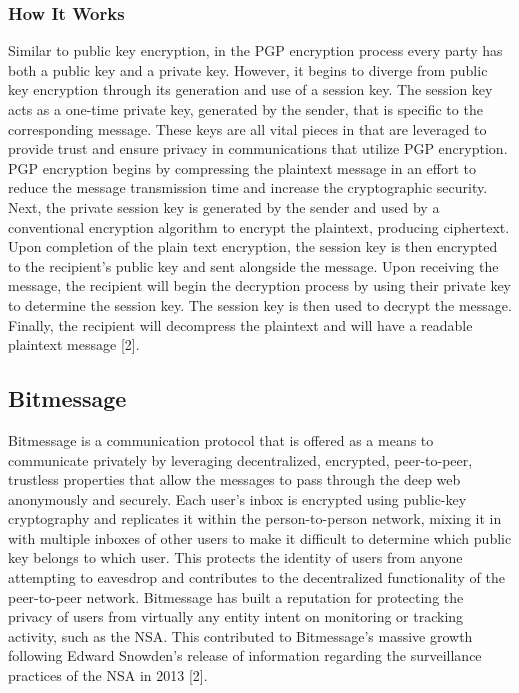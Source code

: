 \documentclass[twocolumn,letterpaper,10pt]{article}
\begin{document}
\subsubsection{How It Works}
Similar to public key encryption, in the PGP encryption process every party has both a public key and a private key. However, it begins to diverge from public key encryption through its generation and use of a session key. The session key acts as a one-time private key, generated by the sender, that is specific to the corresponding message. These keys are all vital pieces in that are leveraged to provide trust and ensure privacy in communications that utilize PGP encryption.
PGP encryption begins by compressing the plaintext message in an effort to reduce the message transmission time and increase the cryptographic security.  Next, the private session key is generated by the sender and used by a conventional encryption algorithm to encrypt the plaintext, producing ciphertext. Upon completion of the plain text encryption, the session key is then encrypted to the recipient’s public key and sent alongside the message. Upon receiving the message, the recipient will begin the decryption process by using their private key to determine the session key. The session key is then used to decrypt the message. Finally, the recipient will decompress the plaintext and will have a readable plaintext message [2].

\subsection{Bitmessage}

Bitmessage is a communication protocol that is offered as a means to communicate privately by leveraging decentralized, encrypted, peer-to-peer, trustless properties that allow the messages to pass through the deep web anonymously and securely. Each user’s inbox is encrypted using public-key cryptography and replicates it within the person-to-person network, mixing it in with multiple inboxes of other users to make it difficult to determine which public key belongs to which user. This protects the identity of users from anyone attempting to eavesdrop and contributes to the decentralized functionality of the peer-to-peer network. Bitmessage has built a reputation for protecting the privacy of users from virtually any entity intent on monitoring or tracking activity, such as the NSA. This contributed to Bitmessage’s massive growth following Edward Snowden’s release of information regarding the surveillance practices of the NSA in 2013 [2].
\end{document}

